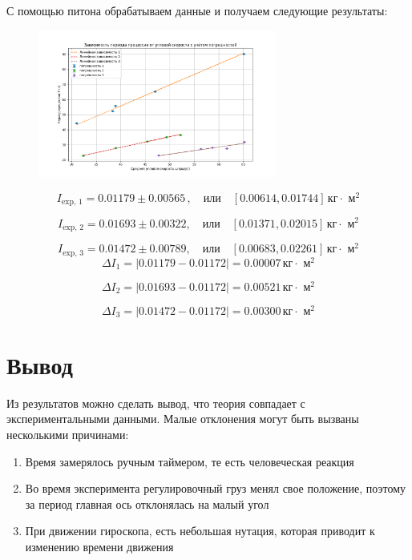 \documentclass[a4paper]{article}
\begin{document}
С помощью питона обрабатываем данные и получаем следующие результаты:


\begin{figure}[H]
\begin{center}
\includegraphics[width=0.7\textwidth]{pick_4.png}
\end{center}
\end{figure}


\[
    I_{\text{exp, 1}} = 0.01179 \pm 0.00565 \, , \quad \text{или} \quad [0.00614, 0.01744] \,\text{кг$\cdot$ м$^2$}
\]

\[
I_{\text{exp, 2}} = 0.01693 \pm 0.00322, \quad \text{или} \quad [0.01371, 0.02015] \,\text{кг$\cdot$ м$^2$}
\]

\[
I_{\text{exp, 3}} = 0.01472 \pm 0.00789, \quad \text{или} \quad [0.00683, 0.02261] \,\text{кг$\cdot$ м$^2$}
\]
\[
\Delta I_{\text{1}} = |0.01179 - 0.01172| = 0.00007 \,\text{кг$\cdot$ м$^2$}
\]

\[
\Delta I_{\text{2}} = |0.01693 - 0.01172| = 0.00521 \,\text{кг$\cdot$ м$^2$}
\]

\[
\Delta I_{\text{3}} = |0.01472 - 0.01172| = 0.00300 \,\text{кг$\cdot$ м$^2$}
\]
\section{\textbf{Вывод}}
Из результатов можно сделать вывод, что теория совпадает с экспериментальными данными. Малые отклонения могут быть вызваны несколькими причинами:
\begin{enumerate}
	\item Время замерялось ручным таймером, те есть человеческая реакция
	\item Во время эксперимента регулировочный груз менял свое положение, поэтому за период главная ось отклонялась на малый угол
	\item При движении гироскопа, есть небольшая нутация, которая приводит к изменению времени движения
\end{enumerate}
\end{document}
